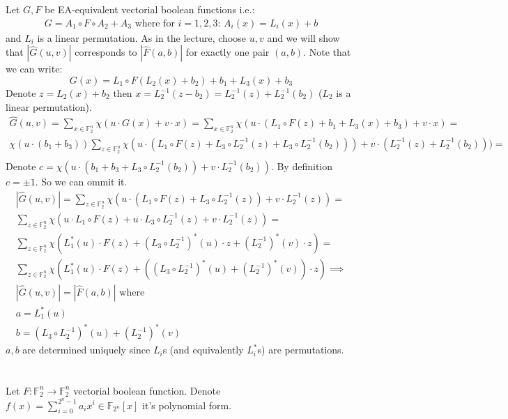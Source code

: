 \documentclass[12pt, a4paper]{article}
\begin{document}
\section{}
Let $G,F$ be EA-equivalent vectorial boolean functions i.e.:
\begin{gather}
G = A_1 \circ F \circ A_2 + A_3 \text{ where for $i=1,2,3$: } A_i(x) = L_i(x) + b
\end{gather}
and $L_i$ is a linear permutation. As in the lecture, choose $u,v$ and we will show that $|\hat{G}(u,v)|$ corresponds to $|\hat{F}(a,b)|$ for exactly one pair $(a,b)$.
Note that we can write:
\[G(x) = L_1 \circ F (L_2(x)+b_2) + b_1 + L_3(x)+b_3\]
Denote $z = L_2(x) + b_2$ then $x = L_2^{-1}(z-b_2) = L_2^{-1}(z) + L_2^{-1}(b_2)$ ($L_2$ is a linear permutation).
\begin{gather*}
\hat{G}(u,v) = \sum\limits_{x \in \mathbb{F}_2^n} \chi(u \cdot G(x) + v\cdot x) = \sum\limits_{x \in \mathbb{F}_2^n} \chi(u \cdot (L_1 \circ F(z) + b_1 + L_3(x)+b_3) + v\cdot x) = \\
\chi(u\cdot(b_1+b_3)) \sum\limits_{z \in \mathbb{F}_2^n} \chi(u \cdot (L_1 \circ F(z) + L_3 \circ L_2^{-1}(z) +L_3 \circ L_2^{-1}(b_2))) + v\cdot (L_2^{-1}(z) +L_2^{-1}(b_2))) =\\
\end{gather*}
Denote $c = \chi(u\cdot(b_1+b_3 + L_3\circ L_2^{-1}(b_2)) + v\cdot L_2^{-1}(b_2))$. By definition $c = \pm 1$. So we can ommit it.
\begin{gather*}
|\hat{G}(u,v)| = \sum\limits_{z \in \mathbb{F}_2^n} \chi(u \cdot (L_1 \circ F(z) + L_3 \circ L_2^{-1}(z)) + v\cdot L_2^{-1}(z)) =\\
\sum\limits_{z \in \mathbb{F}_2^n} \chi(u \cdot L_1 \circ F(z) + u\cdot L_3 \circ L_2^{-1}(z) + v\cdot L_2^{-1}(z)) = \\
\sum\limits_{z \in \mathbb{F}_2^n} \chi(L_1^*(u) \cdot F(z) + (L_3 \circ L_2^{-1})^*(u) \cdot z + (L_2^{-1})^*(v)\cdot z) = \\
\sum\limits_{z \in \mathbb{F}_2^n} \chi(L_1^*(u) \cdot F(z) + ((L_3 \circ L_2^{-1})^*(u) + (L_2^{-1})^*(v))\cdot z) \implies\\
|\hat{G}(u,v)| = |\hat{F}(a,b)| \text{ where }\\
a = L_1^*(u)\\
b = (L_3 \circ L_2^{-1})^*(u) + (L_2^{-1})^*(v)
\end{gather*}
$a,b$ are determined uniquely since $L_i$s (and equivalently $L_i^*$s) are permutations.

\section{}
Let $F: \mathbb{F}_2^n \rightarrow \mathbb{F}_2^n$ vectorial boolean function. Denote $f(x) = \sum\limits_{i = 0}^{2^n-1}a_ix^i \in \mathbb{F}_{2^n}[x]$ it's polynomial form.
\end{document}
